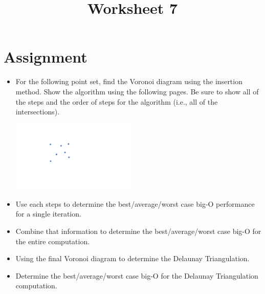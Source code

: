 \documentclass[a4paper,12pt]{article}
\title{Worksheet 7}
\begin{document}
\maketitle

\worksheetGroundRules


\vspace{5pt}
\section{Assignment}

\begin{itemize}



\item For the following point set, find the Voronoi diagram using the insertion method. Show the algorithm using the following pages. Be sure to show all of the steps and the order of steps for the algorithm (i.e., all of the intersections).

\begin{center}
\includegraphics[width=6cm]{../images/voronoi7.pdf}
\end{center}


\item Use each steps to determine the best/average/worst case big-O performance for a single iteration. 
\item Combine that information to determine the best/average/worst case big-O for the entire computation.

\item Using the final Voronoi diagram to determine the Delaunay Triangulation. 

\item Determine the best/average/worst case big-O for the Delaunay Triangulation computation.


\end{itemize}


\worksheetSubmission



\newpage
\end{document}
